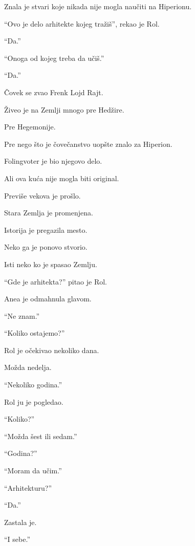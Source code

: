 Znala je stvari koje nikada nije mogla naučiti na Hiperionu.

\bigskip

``Ovo je delo arhitekte kojeg tražiš'', rekao je Rol.

``Da.''

``Onoga od kojeg treba da učiš.''

``Da.''

\bigskip

Čovek se zvao Frenk Lojd Rajt.

Živeo je na Zemlji mnogo pre Hedžire.

Pre Hegemonije.

Pre nego što je čovečanstvo uopšte znalo za Hiperion.

\bigskip

Folingvoter je bio njegovo delo.

Ali ova kuća nije mogla biti original.

Previše vekova je prošlo.

Stara Zemlja je promenjena.

Istorija je pregazila mesto.

\bigskip

Neko ga je ponovo stvorio.

\bigskip

Isti neko ko je spasao Zemlju.

\bigskip

``Gde je arhitekta?'' pitao je Rol.

Anea je odmahnula glavom.

``Ne znam.''

\bigskip

``Koliko ostajemo?''

Rol je očekivao nekoliko dana.

Možda nedelja.

\bigskip

``Nekoliko godina.''

\bigskip

Rol ju je pogledao.

``Koliko?''

``Možda šest ili sedam.''

``Godina?''

``Moram da učim.''

``Arhitekturu?''

``Da.''

Zastala je.

``I sebe.''

\bigskip


